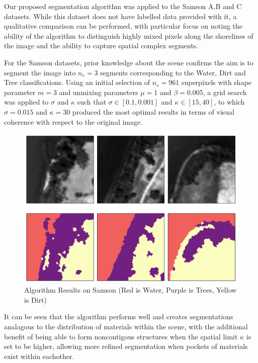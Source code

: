 Our proposed segmentation algorithm was applied to the Samson A,B and C datasets. While this dataset does not have labelled data provided with it, a qualitative comparison can be performed, with particular focus on noting the ability of the algorithm to distinguish highly mixed pixels along the shorelines of the image and the ability to capture spatial complex segments.

For the Samson datasets, prior knowledge about the scene confirms the aim is to segment the image into $n_e = 3$ segments corresponding to the Water, Dirt and Tree classifications. Using an initial selection of $n_s = 961$ superpixels with shape parameter $m=3$ and unmixing parameters $\mu = 1$ and $\beta = 0.005$, a grid search was applied to $\sigma$ and $\kappa$ such that $\sigma \in [0.1, 0.001]$ and $\kappa \in [15, 40]$, to which $\sigma = 0.015$ and $\kappa = 30$ produced the most optimal results in terms of visual coherence with respect to the original image. 
\begin{figure}[H]
    \centering
    \includegraphics[width=15cm]{samsonabc-results.png}  %
    \caption{Algorithm Results on Samson (Red is Water, Purple is Trees, Yellow is Dirt)}
    \label{samson-abc-results}  %
  \end{figure}
It can be seen that the algorithm performs well and creates segmentations analagous to the distribution of materials within the scene, with the additional benefit of being able to form noncontigous structures when the spatial limit $\kappa$ is set to be higher, allowing more refined segmentation when pockets of materials exist within eachother. 





